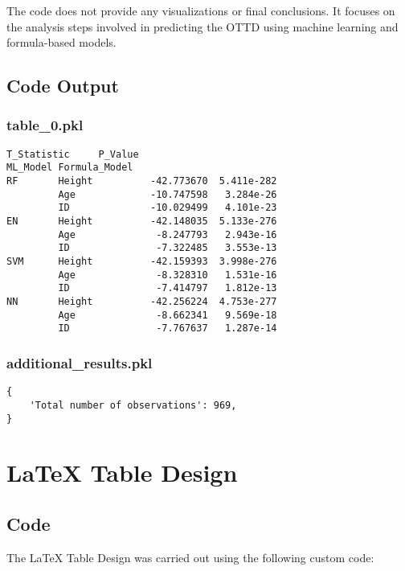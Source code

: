 \documentclass[11pt]{article}
\begin{document}
The code does not provide any visualizations or final conclusions. It focuses on the analysis steps involved in predicting the OTTD using machine learning and formula-based models.

\subsection{Code Output}

\subsubsection*{table\_0.pkl}

\begin{Verbatim}[tabsize=4]
                        T_Statistic     P_Value
ML_Model Formula_Model
RF       Height          -42.773670  5.411e-282
         Age             -10.747598   3.284e-26
         ID              -10.029499   4.101e-23
EN       Height          -42.148035  5.133e-276
         Age              -8.247793   2.943e-16
         ID               -7.322485   3.553e-13
SVM      Height          -42.159393  3.998e-276
         Age              -8.328310   1.531e-16
         ID               -7.414797   1.812e-13
NN       Height          -42.256224  4.753e-277
         Age              -8.662341   9.569e-18
         ID               -7.767637   1.287e-14
\end{Verbatim}

\subsubsection*{additional\_results.pkl}

\begin{Verbatim}[tabsize=4]
{
    'Total number of observations': 969,
}
\end{Verbatim}

\section{LaTeX Table Design}
\subsection{{Code}}
The LaTeX Table Design was carried out using the following custom code:
\end{document}
